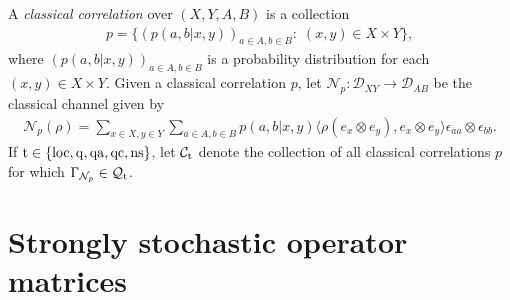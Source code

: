 \documentclass[11pt]{amsart}
\newcommand{\cl}[1]{\mathcal{#1}}
\begin{document}
A \textit{classical correlation} over $(X, Y, A, B)$ is a collection
\begin{gather*}
	p = \bigg\{(p(a, b|x, y))_{a \in A, b \in B}: \; (x, y) \in X\times Y\bigg\},
\end{gather*}
\noindent where $(p(a, b|x, y))_{a \in A, b \in B}$ is a probability distribution for each $(x, y) \in X\times Y$. Given a classical correlation $p$, let $\cl{N}_{p}: \cl{D}_{XY}\rightarrow \cl{D}_{AB}$ be the classical channel given by
\begin{gather}
	\cl{N}_{p}(\rho) = \sum\limits_{x \in X, y \in Y}\sum\limits_{a \in A, b \in B}p(a, b|x, y)\langle \rho(e_{x}\otimes e_{y}), e_{x}\otimes e_{y}\rangle\epsilon_{aa}\otimes \epsilon_{bb}.
\end{gather}
If ${\rm t} \in \{\rm loc, q, qa, qc, ns\}$, let $\cl{C}_{\rm t}$ denote the collection of all classical correlations $p$ for which $\Gamma_{\cl{N}_{p}} \in \cl{Q}_{\rm t}$.
 

\section{Strongly stochastic operator matrices}\label{s_ssom}
\end{document}

